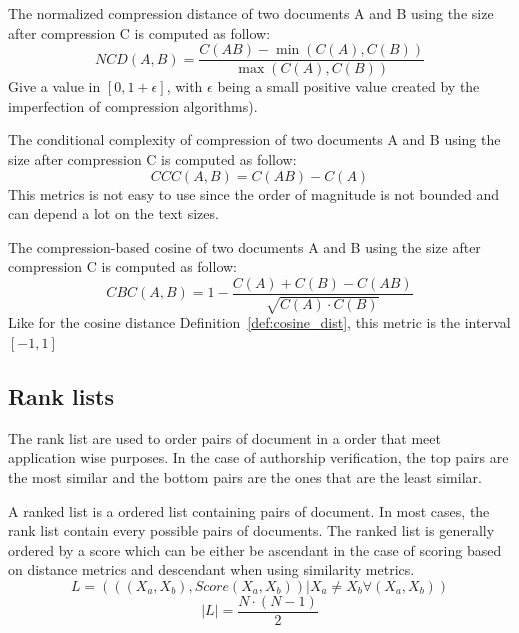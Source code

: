 \begin{definition}
  The normalized compression distance of two documents A and B using the size after compression C is computed as follow:
  \begin{equation}
    NCD(A, B) = \frac{C(AB) - \min(C(A), C(B))}{\max(C(A), C(B))}
  \end{equation}
  Give a value in $\left[0, 1+\epsilon\right]$, with $\epsilon$ being a small positive value created by the imperfection of compression algorithms).
\end{definition}

\begin{definition}
  The conditional complexity of compression of two documents A and B using the size after compression C is computed as follow:
  \begin{equation}
    CCC(A, B) = C(AB) - C(A)
  \end{equation}
  This metrics is not easy to use since the order of magnitude is not bounded and can depend a lot on the text sizes.
\end{definition}

\begin{definition}
  The compression-based cosine of two documents A and B using the size after compression C is computed as follow:
  \begin{equation}
    CBC(A, B) = 1 - \frac{C(A) + C(B) - C(AB)}{\sqrt{C(A) \cdot C(B)}}
  \end{equation}
  Like for the cosine distance Definition~\ref{def:cosine_dist}, this metric is the interval $\left[-1, 1 \right]$
\end{definition}

\subsection{Rank lists}

The rank list are used to order pairs of document in a order that meet application wise purposes.
In the case of authorship verification, the top pairs are the most similar and the bottom pairs are the ones that are the least similar.

\begin{definition}
  A ranked list is a ordered list containing pairs of document.
  In most cases, the rank list contain every possible pairs of documents.
  The ranked list is generally ordered by a score which can be either be ascendant in the case of scoring based on distance metrics and descendant when using similarity metrics.
  \begin{equation}
    L = (((X_a, X_b), Score(X_a, X_b)) | X_a \neq X_b \forall (X_a, X_b))
  \end{equation}
  \begin{equation}
    |L| = \frac{N \cdot (N - 1)}{2}
  \end{equation}
\end{definition}

